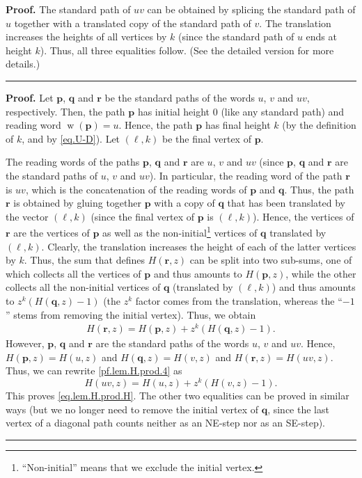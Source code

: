 \documentclass[numbers=enddot,12pt,final,onecolumn,notitlepage]{scrartcl}%
\theoremstyle{definition}
\newenvironment{proof}[1][Proof]{\noindent\textbf{#1.} }{\ \rule{0.5em}{0.5em}}
\newcommand{\pp}{\mathbf{p}}
\newcommand{\qq}{\mathbf{q}}
\newcommand{\rr}{\mathbf{r}}
\newcommand{\w}{\operatorname{w}}
\newcommand{\tup}[1]{\left( #1 \right)}
\newenvironment{verlong}{}{}
\newenvironment{vershort}{}{}
\begin{document}
\begin{vershort}
\begin{proof}
The standard path of $uv$ can be obtained by splicing the standard path of $u$ together with a translated copy of the standard path of $v$.
The translation increases the heights of all vertices by $k$ (since the standard path of $u$ ends at height $k$).
Thus, all three equalities follow.
(See the detailed version for more details.)
\end{proof}
\end{vershort}

\begin{verlong}
\begin{proof}
    Let $\pp$, $\qq$ and $\rr$ be the standard paths of the words $u$, $v$ and $uv$, respectively.
    Then, the path $\pp$ has initial height $0$ (like any standard path) and reading word $\w\tup{\pp} = u$. Hence, the path
    $\pp$ has final height $k$ (by the definition of $k$, and by \eqref{eq.U-D}).
    Let $\tup{\ell, k}$ be the final vertex of $\pp$.
    
    The reading words of the paths $\pp$, $\qq$ and $\rr$ are $u$, $v$ and $uv$ (since $\pp$, $\qq$ and $\rr$ are the standard paths of $u$, $v$ and $uv$).
    In particular,
    the reading word of the path $\rr$ is $uv$, which is the concatenation of the reading words of $\pp$ and $\qq$. Thus, the path $\rr$ is obtained by gluing together $\pp$ with a copy of $\qq$ that has been translated by the vector $\tup{\ell, k}$
    (since the final vertex of $\pp$ is $\tup{\ell, k}$).
    Hence, the vertices of $\rr$ are the vertices of $\pp$ as well as the non-initial\footnote{``Non-initial'' means that we exclude the initial vertex.} vertices of $\qq$ translated by $\tup{\ell, k}$.
    Clearly, the translation increases the height of each of the latter vertices by $k$.
    Thus, the sum that defines $H\tup{\rr, z}$ can be split into two sub-sums, one of which collects all the vertices of $\pp$ and thus amounts to $H\tup{\pp, z}$, while the other collects all the non-initial vertices of $\qq$ (translated by $\tup{\ell, k}$) and thus amounts to $z^k \tup{H\tup{\qq, z} - 1}$ (the $z^k$ factor comes from the translation, whereas the ``$-1$'' stems from removing the initial vertex). Thus, we obtain
    \begin{align}
    H\tup{\rr, z}
    = H\tup{\pp, z} + z^k \tup{H\tup{\qq, z} - 1} .
    \label{pf.lem.H.prod.4}
    \end{align}
    However, $\pp$, $\qq$ and $\rr$ are the standard paths of the words $u$, $v$ and $uv$. Hence, $H\tup{\pp, z} = H\tup{u, z}$ and $H\tup{\qq, z} = H\tup{v, z}$ and $H\tup{\rr, z} = H\tup{uv, z}$.
    Thus, we can rewrite \eqref{pf.lem.H.prod.4} as
    \[
    H\tup{uv, z} = H\tup{u,z} + z^k \tup{H\tup{v,z}-1}.
    \]
    This proves \eqref{eq.lem.H.prod.H}.
    The other two equalities can be proved in similar ways (but we no longer need to remove the initial vertex of $\qq$, since the last vertex of a diagonal path counts neither as an NE-step nor as an SE-step).
\end{proof}
\end{verlong}
\end{document}
